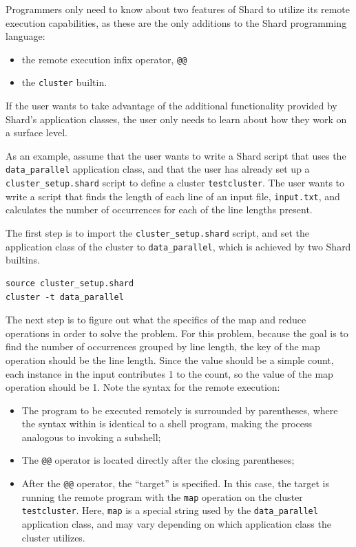 \documentclass[twoside]{report}
\begin{document}
Programmers only need to know about two features of Shard to utilize its remote execution capabilities, as these are the only additions to the Shard programming language:
\begin{itemize}
  \item the remote execution infix operator, \texttt{@@}
  \item the \texttt{cluster} builtin.
\end{itemize}
If the user wants to take advantage of the additional functionality provided by Shard's application classes, the user only needs to learn about how they work on a surface level.

As an example, assume that the user wants to write a Shard script that uses the \texttt{data\_parallel} application class, and that the user has already set up a \texttt{cluster\_setup.shard} script to define a cluster \texttt{testcluster}.
The user wants to write a script that finds the length of each line of an input file, \texttt{input.txt}, and calculates the number of occurrences for each of the line lengths present.

The first step is to import the \texttt{cluster\_setup.shard} script, and set the application class of the cluster to \texttt{data\_parallel}, which is achieved by two Shard builtins.

\begin{minipage}[c]{\textwidth-15pt}
  \begin{lstlisting}[language=Shard]
source cluster_setup.shard
cluster -t data_parallel
\end{lstlisting}
  \smallskip
\end{minipage}

The next step is to figure out what the specifics of the map and reduce operations in order to solve the problem.
For this problem, because the goal is to find the number of occurrences grouped by line length, the key of the map operation should be the line length.
Since the value should be a simple count, each instance in the input contributes 1 to the count, so the value of the map operation should be 1.
Note the syntax for the remote execution:
\begin{itemize}
  \item The program to be executed remotely is surrounded by parentheses, where the syntax within is identical to a shell program, making the process analogous to invoking a subshell;
  \item The \texttt{@@} operator is located directly after the closing parentheses;
  \item After the \texttt{@@} operator, the ``target'' is specified. In this case, the target is running the remote program with the \texttt{map} operation on the cluster \texttt{testcluster}. Here, \texttt{map} is a special string used by the \texttt{data\_parallel} application class, and may vary depending on which application class the cluster utilizes.
\end{itemize}
\end{document}
